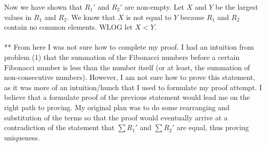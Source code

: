 \documentclass[12pt]{article}
\begin{document}
Now we have shown that $R_{1}'$ and $R_{2}'$ are non-empty. Let $X$ and $Y$ be the largest values in $R_{1}$ and $R_{2}$. We know that $X$ is not equal to $Y$ because $R_{1}$ and $R_{2}$ contain no common elements. WLOG let $X < Y$.
\\\\
** From here I was not sure how to complete my proof. I had an intuition from problem (1) that the summation of the Fibonacci numbers before a certain Fibonacci number is less than the number itself (or at least, the summation of non-consecutive numbers). However, I am not sure how to prove this statement, as it was more of an intuition/hunch that I used to formulate my proof attempt. I believe that a formulate proof of the previous statement would lead me on the right path to proving. My original plan was to do some rearranging and substitution of the terms so that the proof would eventually arrive at a contradiction of the statement that $\sum {R_{1}'}$ and $\sum {R_{2}'}$ are equal, thus proving uniqueness.
\end{document}
